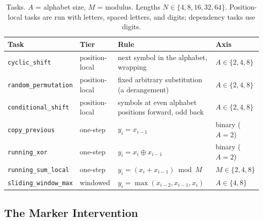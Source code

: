 \documentclass[10pt]{article} %
\newcommand{\task}[1]{\texttt{#1}}
\begin{document}
\begin{table}[H]
\centering
\small
\caption{Tasks. $A$ = alphabet size, $M$ = modulus. Lengths $N \in \{4, 8, 16, 32, 64\}$. Position-local tasks are run with letters, spaced letters, and digits; dependency tasks use digits.}
\label{tab:tasks}
\begin{tabular}{llll}
\toprule
Task & Tier & Rule & Axis \\
\midrule
\task{cyclic\_shift} & position-local & next symbol in the alphabet, wrapping & $A \in \{2,4,8\}$ \\
\task{random\_permutation} & position-local & fixed arbitrary substitution (a derangement) & $A \in \{2,4,8\}$ \\
\task{conditional\_shift} & position-local & symbols at even alphabet positions forward, odd back & $A \in \{2,4,8\}$ \\
\midrule
\task{copy\_previous} & one-step & $y_i = x_{i-1}$ & binary ($A = 2$) \\
\task{running\_xor} & one-step & $y_i = x_i \oplus x_{i-1}$ & binary ($A = 2$) \\
\task{running\_sum\_local} & one-step & $y_i = (x_i + x_{i-1}) \bmod M$ & $M \in \{2,4,8\}$ \\
\task{sliding\_window\_max} & windowed & $y_i = \max(x_{i-2}, x_{i-1}, x_i)$ & $A \in \{4,8\}$ \\
\bottomrule
\end{tabular}
\end{table}

\subsection{The Marker Intervention}
\end{document}
